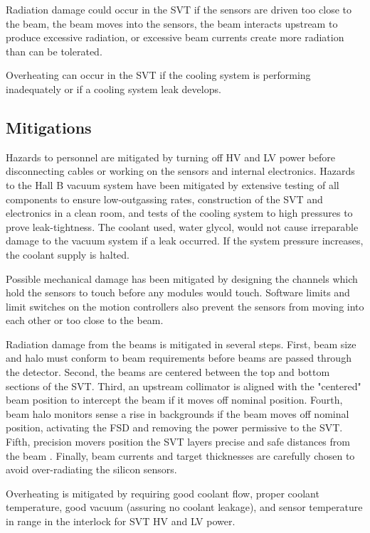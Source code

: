 \documentclass[11pt]{report}
\begin{document}
Radiation damage could occur in the SVT  if the sensors are driven too close to the beam, the beam moves into the sensors, the beam interacts upstream to produce excessive radiation, or excessive beam currents create more radiation than can be tolerated.

Overheating can occur in the SVT  if the cooling system is performing inadequately or if a cooling system leak develops.

\subsection{Mitigations}
\indent

Hazards to personnel are mitigated by turning off HV and LV power before disconnecting cables or working on the sensors and internal electronics.
Hazards to the Hall B vacuum system have been mitigated by extensive testing of all components to ensure low-outgassing rates, construction of the SVT and electronics in a clean room, and tests of the cooling system to high pressures to prove leak-tightness. The coolant used, water glycol, would not cause irreparable damage to the vacuum system if a leak occurred. If the system pressure  increases, the coolant supply is halted.

Possible mechanical damage has been mitigated by designing the channels which hold the sensors to touch before any modules would touch. Software limits and  limit switches on the motion controllers also prevent the sensors from moving into each other or too close to the beam.

Radiation damage from the beams is mitigated in several steps. First, beam size and halo must conform to beam requirements before beams are passed through the detector. Second, the beams are centered between the top and bottom sections of the SVT. Third, an upstream collimator is aligned with the "centered" beam position to intercept the beam if it moves off nominal position. Fourth, beam halo monitors sense a rise in backgrounds if the beam moves off nominal position, activating the FSD and removing the power permissive to the SVT. Fifth, precision movers position the SVT layers precise and safe distances from the beam . Finally, beam currents and target thicknesses are carefully chosen to avoid over-radiating the silicon sensors.

Overheating is mitigated by requiring good coolant flow, proper coolant temperature, good vacuum (assuring no coolant leakage), and sensor temperature in range  in the interlock for SVT HV and LV power. 
\end{document}
